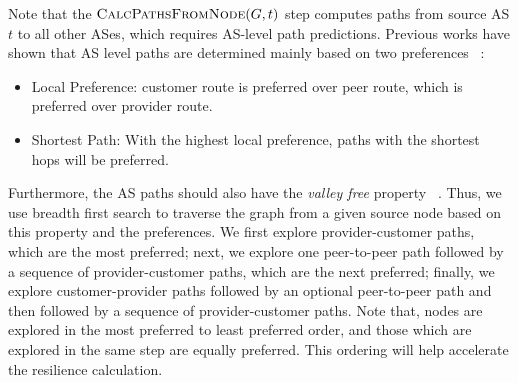 Note that the $\Call{CalcPathsFromNode}{G,t}$ step computes paths from source AS $t$ to all other ASes, which requires AS-level path predictions. Previous works have shown that AS level paths are determined mainly based on two preferences ~\cite{gao2001stable}:

\begin{itemize}
\item Local Preference: customer route is preferred over peer route, which is preferred over provider route. 
\item Shortest Path: With the highest local preference, paths with the shortest hops will be preferred. 
\end{itemize}

Furthermore, the AS paths should also have the \emph{valley free} property ~\cite{gao2001inferring}. Thus, we use breadth first search to traverse the graph from a given source node based on this property and the preferences. We first explore provider-customer paths, which are the most preferred; next, we explore one peer-to-peer path followed by a sequence of provider-customer paths, which are the next preferred; finally, we explore customer-provider paths followed by an optional peer-to-peer path and then followed by a sequence of provider-customer paths. Note that, nodes are explored in the most preferred to least preferred order, and those which are explored in the same step are equally preferred. This ordering will help accelerate the resilience calculation.



